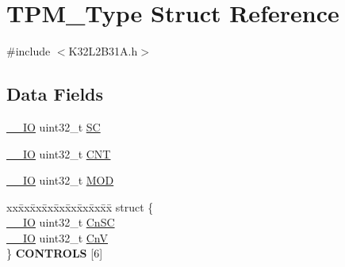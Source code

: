 \hypertarget{struct_t_p_m___type}{}\section{T\+P\+M\+\_\+\+Type Struct Reference}
\label{struct_t_p_m___type}


{\ttfamily \#include $<$K32\+L2\+B31\+A.\+h$>$}

\subsection*{Data Fields}
\begin{DoxyCompactItemize}
\item 
\mbox{\hyperlink{core__cm0plus_8h_aec43007d9998a0a0e01faede4133d6be}{\+\_\+\+\_\+\+IO}} uint32\+\_\+t \mbox{\hyperlink{struct_t_p_m___type_a71c139861c5c28b6a6e81b2b1c72946a}{SC}}
\item 
\mbox{\hyperlink{core__cm0plus_8h_aec43007d9998a0a0e01faede4133d6be}{\+\_\+\+\_\+\+IO}} uint32\+\_\+t \mbox{\hyperlink{struct_t_p_m___type_a6095a27d764d06750fc0d642e08f8b2a}{C\+NT}}
\item 
\mbox{\hyperlink{core__cm0plus_8h_aec43007d9998a0a0e01faede4133d6be}{\+\_\+\+\_\+\+IO}} uint32\+\_\+t \mbox{\hyperlink{struct_t_p_m___type_aa35a6713b1e2aafa0749f986730795cb}{M\+OD}}
\item 
\mbox{\label{struct_t_p_m___type_a039da26e6cbf6d5bb81c72a96419a33b}} 
\begin{tabbing}
xx\=xx\=xx\=xx\=xx\=xx\=xx\=xx\=xx\=\kill
struct \{\\
\>\mbox{\hyperlink{core__cm0plus_8h_aec43007d9998a0a0e01faede4133d6be}{\_\_IO}} uint32\_t \mbox{\hyperlink{struct_t_p_m___type_a3c6b2dbabce20880a5d35da93176e863}{CnSC}}\\
\>\mbox{\hyperlink{core__cm0plus_8h_aec43007d9998a0a0e01faede4133d6be}{\_\_IO}} uint32\_t \mbox{\hyperlink{struct_t_p_m___type_abbc17ee9708ecdd4ddc9cb9e528bdbac}{CnV}}\\
\} {\bfseries CONTROLS} \mbox{[}6\mbox{]}\\


\end{tabbing}
\end{DoxyCompactItemize}
